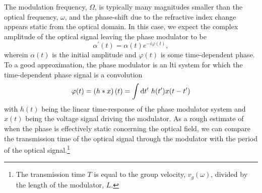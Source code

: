 The modulation frequency, $\Omega$, is typically many magnitudes smaller than the optical frequency, $\omega$, and the phase-shift due to the refractive index change appears static from the optical domain.
In this case, we expect the complex amplitude of the optical signal leaving the phase modulator to be
\begin{equation}
	\alpha^\prime(t)
	=
	\alpha(t)
	e^{-i\varphi(t)}
	\label{eq:phase_modulation}
	,
\end{equation}
wherein $\alpha(t)$ is the initial amplitude and $\varphi(t)$ is some time-dependent phase.
To a good approximation, the phase modulator is an \gls{lti} system for which the time-dependent phase signal is a convolution
\begin{equation}
	\varphi(t)
	=
	\left(h\conv x\right)(t)
	=
	\int\dd{t^\prime}
	h(t^\prime)
	x(t-t^\prime)
\end{equation}
with $h(t)$ being the linear time-response of the phase modulator system and $x(t)$ being the voltage signal driving the modulator.
As a rough estimate of when the phase is effectively static concerning the optical field, we can compare the transmission time of the optical signal through the modulator with the period of the optical signal.\footnote{The transmission time $T$ is equal to the group velocity, $v_g(\omega)$, divided by the length of the modulator, $L$.}



